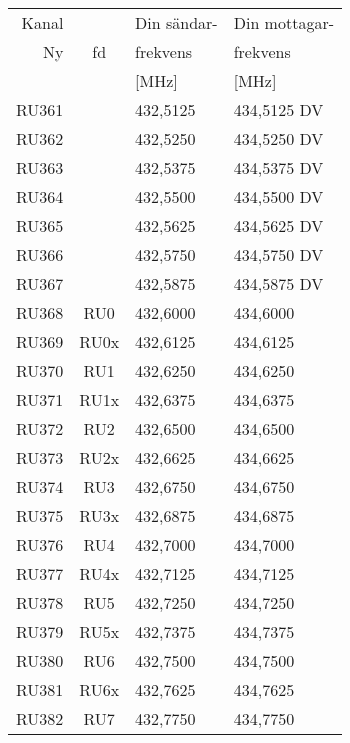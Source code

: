 
\begin{tabular}{ r | c | l | l }
	Kanal &       & Din sändar-        & Din mottagar-  \\
	Ny    & fd    & frekvens       & frekvens \\
          &       & [\unit{\mega\hertz}] & [\unit{\mega\hertz}] \\
	\hline
	RU361 &       & 432,5125       & 434,5125 DV    \\
	RU362 &       & 432,5250       & 434,5250 DV    \\
	RU363 &       & 432,5375       & 434,5375 DV    \\
	RU364 &       & 432,5500       & 434,5500 DV    \\
	RU365 &       & 432,5625       & 434,5625 DV    \\
	RU366 &       & 432,5750       & 434,5750 DV    \\
	RU367 &       & 432,5875       & 434,5875 DV    \\
	RU368 & RU0   & 432,6000       & 434,6000       \\
	RU369 & RU0x  & 432,6125       & 434,6125       \\
	RU370 & RU1   & 432,6250       & 434,6250       \\
	RU371 & RU1x  & 432,6375       & 434,6375       \\
	RU372 & RU2   & 432,6500       & 434,6500       \\
	RU373 & RU2x  & 432,6625       & 434,6625       \\
	RU374 & RU3   & 432,6750       & 434,6750       \\
	RU375 & RU3x  & 432,6875       & 434,6875       \\
	RU376 & RU4   & 432,7000       & 434,7000       \\
	RU377 & RU4x  & 432,7125       & 434,7125       \\
	RU378 & RU5   & 432,7250       & 434,7250       \\
	RU379 & RU5x  & 432,7375       & 434,7375       \\
	RU380 & RU6   & 432,7500       & 434,7500       \\
	RU381 & RU6x  & 432,7625       & 434,7625       \\
	RU382 & RU7   & 432,7750       & 434,7750       \\

\end{tabular}
